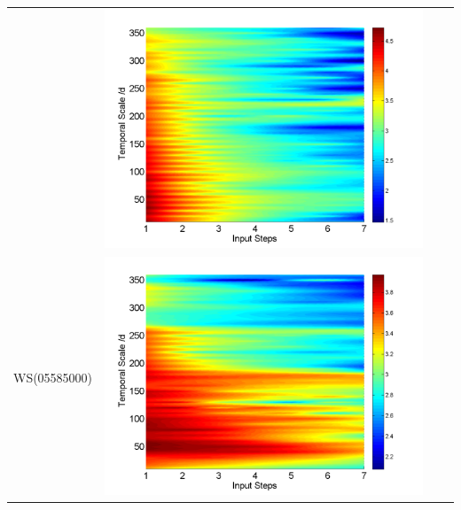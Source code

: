 \documentclass[review]{elsarticle}
\begin{document}
\begin{table}[H]
\begin{tabular}{cccc}
&\begin{minipage}{.3\textwidth}\includegraphics[width=\linewidth]{resultgraph/02143000pepq_rela.png}\end{minipage}
\\
WS(05585000)
&\begin{minipage}{.3\textwidth}\includegraphics[width=\linewidth]{resultgraph/05585000p_rela.png}\end{minipage}

\end{tabular}
\end{table}
\end{document}
